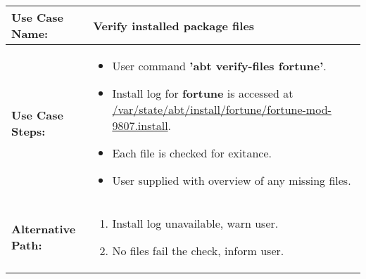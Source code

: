 \medskip

\begin{tabularx}{\linewidth}{|l|X|}
\hline
\textbf{Use Case Name:} & \textbf{Verify installed package files} \\
\hline
\textbf{Use Case Steps:} & 
\begin{minipage}{\linewidth} 
  \vspace{0.05em}
  \begin{itemize}
    \item User command \textbf{'abt verify-files fortune'}.
    \item Install log for \textbf{fortune} is accessed at \url{/var/state/abt/install/fortune/fortune-mod-9807.install}.
    \item Each file is checked for exitance.
    \item User supplied with overview of any missing files.
  \end{itemize}
  \vspace{0.05em}
\end{minipage}
\\
\hline 
\textbf{Alternative Path:} &
\begin{minipage}{\linewidth}
  \vspace{0.05em} 
  \begin{enumerate}
    \item Install log unavailable, warn user.
    \item No files fail the check, inform user.
  \end{enumerate}
  \vspace{0.05em} 
\end{minipage}
\\
\hline
\end{tabularx}